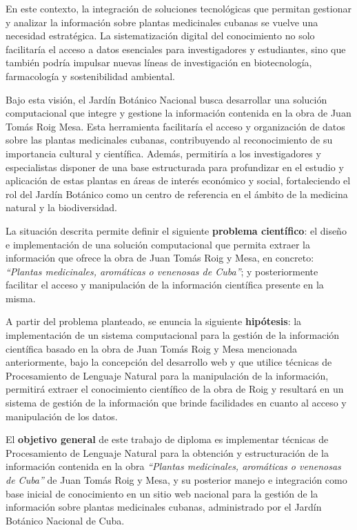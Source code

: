 En este contexto, la integración de soluciones tecnológicas que permitan gestionar y 
analizar la información sobre plantas medicinales cubanas se vuelve una necesidad estratégica. 
La sistematización digital del conocimiento no solo facilitaría el acceso a datos esenciales 
para investigadores y estudiantes, sino que también podría impulsar nuevas líneas de 
investigación en biotecnología, farmacología y sostenibilidad ambiental.

Bajo esta visión, el Jardín Botánico Nacional busca desarrollar una solución computacional 
que integre y gestione la información contenida en la obra de Juan Tomás Roig Mesa. 
Esta herramienta facilitaría el acceso y organización de datos sobre las plantas medicinales 
cubanas, contribuyendo al reconocimiento de su importancia cultural y científica. 
Además, permitiría a los investigadores y especialistas disponer de una base estructurada 
para profundizar en el estudio y aplicación de estas plantas en áreas de interés 
económico y social, fortaleciendo el rol del Jardín Botánico como un centro 
de referencia en el ámbito de la medicina natural y la biodiversidad.

La situación descrita permite definir el siguiente \textbf{problema científico}: 
el diseño e implementación de una solución computacional que permita extraer 
la información que ofrece la obra de Juan Tomás Roig y Mesa, en concreto: 
\textit{``Plantas medicinales, aromáticas o venenosas de Cuba''}; y posteriormente 
facilitar el acceso y manipulación de la información científica presente en la misma. 

A partir del problema planteado, se enuncia la siguiente \textbf{hipótesis}: 
la implementación de un sistema computacional para la gestión de la información 
científica basado en la obra de Juan Tomás Roig y Mesa mencionada anteriormente, 
bajo la concepción del desarrollo web y que utilice técnicas de Procesamiento de 
Lenguaje Natural para la manipulación de la información, permitirá extraer el 
conocimiento científico de la obra de Roig y resultará en un sistema de gestión de 
la información que brinde facilidades en cuanto al acceso y manipulación de los datos. 

El \textbf{objetivo general} de este trabajo de diploma es implementar técnicas 
de Procesamiento de Lenguaje Natural para la obtención y estructuración de la información 
contenida en la obra \textit{``Plantas medicinales, aromáticas o venenosas de Cuba''} de 
Juan Tomás Roig y Mesa, y su posterior manejo e integración como base inicial de conocimiento 
en un sitio web nacional para la gestión de la información sobre plantas medicinales cubanas, 
administrado por el Jardín Botánico Nacional de Cuba.

